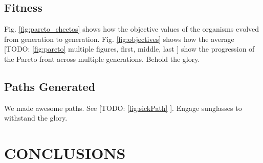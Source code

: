 \documentclass[letterpaper, 10 pt, conference]{ieeeconf}  %
\newcommand{\todo}[1]{{\color{blue}[TODO: #1]}}
\begin{document}
\subsection{Fitness}

Fig. \ref{fig:pareto_cheetos} shows how the objective values of the organisms evolved from generation to generation. Fig. \ref{fig:objectives} shows how the average 
\todo{ \ref{fig:pareto} multiple figures, first, middle, last } show the progression of the Pareto front across multiple generations. Behold the glory.

\subsection{Paths Generated}

We made awesome paths. See \todo{ \ref{fig:sickPath} }. Engage sunglasses to withstand the glory.



\section{CONCLUSIONS}\label{conclusions}










\end{document}
